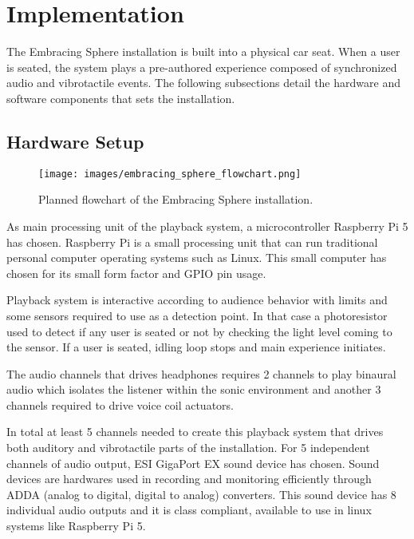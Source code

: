 \chapter{Implementation}
    The Embracing Sphere installation is built into a physical car seat. When a user is seated, the system plays a pre-authored experience composed of synchronized audio and vibrotactile events. The following subsections detail the hardware and software components that sets the installation.\par
    \section{Hardware Setup}
        \begin{figure}[H]
            \centering
            \texttt{[image: images/embracing\_sphere\_flowchart.png]}
            \caption{Planned flowchart of the Embracing Sphere installation.}
            \label{fig:ES_FLOW}
        \end{figure}

        As main processing unit of the playback system, a microcontroller Raspberry Pi 5 has chosen. Raspberry Pi is a small processing unit that can run traditional personal computer operating systems such as Linux. This small computer has chosen for its small form factor and GPIO pin usage.\par

        Playback system is interactive according to audience behavior with limits and some sensors required to use as a detection point. In that case a photoresistor used to detect if any user is seated or not by checking the light level coming to the sensor. If a user is seated, idling loop stops and main experience initiates.\par

        The audio channels that drives headphones requires 2 channels to play binaural audio which isolates the listener within the sonic environment and another 3 channels required to drive voice coil actuators.\par

        In total at least 5 channels needed to create this playback system that drives both auditory and vibrotactile parts of the installation. For 5 independent channels of audio output, ESI GigaPort EX sound device has chosen. Sound devices are hardwares used in recording and monitoring efficiently through ADDA (analog to digital, digital to analog) converters\cite{Sound_Reinforcement}. This sound device has 8 individual audio outputs and it is class compliant, available to use in linux systems like Raspberry Pi 5.\par

